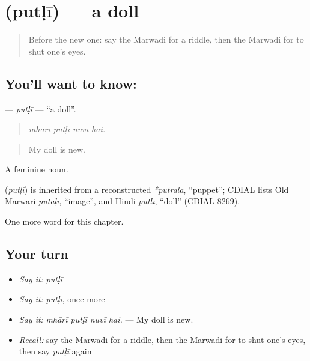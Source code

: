 \section[\texorpdfstring{\mw{पुतळी} (putḷī)}{पुतळी (putḷī)}]{ (putḷī) — a doll}

\label{lesson:MW-C278-putli}



\begin{quote}
Before the new one: say the Marwadi for a riddle, then the Marwadi for to shut one's eyes.
\end{quote}

\subsection*{You'll want to know: }
\textbf{} — \emph{putḷī} — \textquotedblleft{}a doll\textquotedblright{}.

\begin{quote}
   
\end{quote}

\begin{quote}
\emph{mhārī putḷī nuvī hai.}
\end{quote}

\begin{quote}
My doll is new.
\end{quote}

A feminine noun.

\begin{cousinweb}
\textbf{} (\emph{putḷī}) is inherited from a reconstructed \emph{*putrala}, \textquotedblleft{}puppet\textquotedblright{}; CDIAL lists Old Marwari \emph{pūtaḷī}, \textquotedblleft{}image\textquotedblright{}, and Hindi \emph{putlī}, \textquotedblleft{}doll\textquotedblright{} (CDIAL 8269).
\end{cousinweb}

\begin{grammarlens}[title={What you've built}]
One more word for this chapter.
\end{grammarlens}

\subsection*{Your turn}
\begin{itemize}
\raggedright
  \item \emph{Say it:} \emph{putḷī}
  \item \emph{Say it:} \emph{putḷī}, once more
  \item \emph{Say it:} \emph{mhārī putḷī nuvī hai.} — My doll is new.
  \item \emph{Recall:} say the Marwadi for a riddle, then the Marwadi for to shut one's eyes, then say \emph{putḷī} again
\end{itemize}

